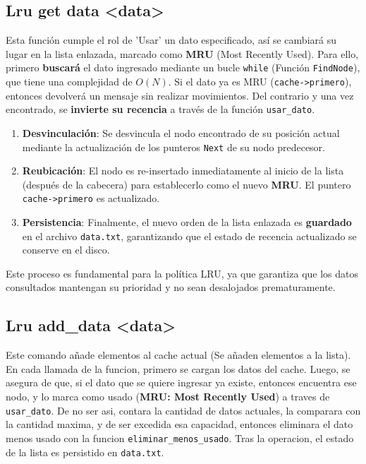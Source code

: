     \subsection{Lru get data \textless data\textgreater}
    Esta función cumple el rol de 'Usar' un dato especificado, así se cambiará su lugar en la lista enlazada, marcado como \textbf{MRU} (Most Recently Used). 
    Para ello, primero \textbf{buscará} el dato ingresado mediante un bucle \texttt{while} (Función \texttt{FindNode}), que tiene una complejidad de $O(N)$. 
    Si el dato ya es MRU (\texttt{cache->primero}), entonces devolverá un mensaje sin realizar movimientos. Del contrario y una vez encontrado,
    se \textbf{invierte su recencia} a través de la función \texttt{usar\_dato}.
    \begin{enumerate}
        \item \textbf{Desvinculación}: Se desvincula el nodo encontrado de su posición actual mediante la actualización de los punteros \texttt{Next} de su nodo predecesor.
        \item \textbf{Reubicación}: El nodo es re-insertado inmediatamente al inicio de la lista (después de la cabecera) para establecerlo como el nuevo \textbf{MRU}. El puntero \texttt{cache->primero} es actualizado.
        \item \textbf{Persistencia}: Finalmente, el nuevo orden de la lista enlazada es \textbf{guardado} en el archivo \texttt{data.txt}, garantizando que el estado de recencia actualizado se conserve en el disco.
    \end{enumerate}
    Este proceso es fundamental para la política LRU, ya que garantiza que los datos consultados mantengan su prioridad y no sean desalojados prematuramente.

    \subsection{Lru add\_data \textless data\textgreater} 
    Este comando añade elementos al cache actual (Se añaden elementos a la lista). En cada llamada de la funcion, primero se cargan los datos del cache. 
    Luego, se asegura de que, si el dato que se quiere ingresar ya existe, entonces encuentra ese nodo, y lo marca como usado (\textbf{MRU: Most Recently Used}) a traves de \texttt{usar\_dato}. 
    De no ser asi, contara la cantidad de datos actuales, la comparara con la cantidad maxima, y de ser excedida esa capacidad, entonces eliminara el dato menos usado 
    con la funcion \texttt{eliminar\_menos\_usado}. Tras la operacion, el estado de la lista es persistido en \texttt{data.txt}.


